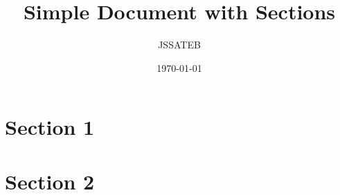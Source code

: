 \documentclass[12pt,a4paper]{article}
\title{Simple Document with Sections}
\author{JSSATEB}
\date{\today}
\begin{document}
	\maketitle

	\section{Section 1}
		\lipsum[1]
		
	\section{Section 2}
		\lipsum
\end{document}
